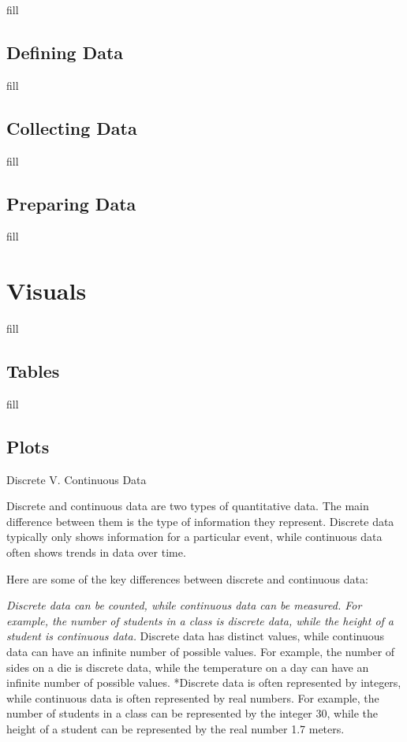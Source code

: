 \documentclass[
  b5paper]{book}
\begin{document}
fill

\hypertarget{defining-data}{%
\section{Defining Data}\label{defining-data}}

fill

\hypertarget{collecting-data}{%
\section{Collecting Data}\label{collecting-data}}

fill

\hypertarget{preparing-data}{%
\section{Preparing Data}\label{preparing-data}}

fill

\hypertarget{visuals-1}{%
\chapter{Visuals}\label{visuals-1}}

fill

\hypertarget{tables}{%
\section{Tables}\label{tables}}

fill

\hypertarget{plots}{%
\section{Plots}\label{plots}}

Discrete V. Continuous Data

Discrete and continuous data are two types of quantitative data. The main difference between them is the type of information they represent. Discrete data typically only shows information for a particular event, while continuous data often shows trends in data over time.

Here are some of the key differences between discrete and continuous data:

\emph{Discrete data can be counted, while continuous data can be measured. For example, the number of students in a class is discrete data, while the height of a student is continuous data.} Discrete data has distinct values, while continuous data can have an infinite number of possible values. For example, the number of sides on a die is discrete data, while the temperature on a day can have an infinite number of possible values. *Discrete data is often represented by integers, while continuous data is often represented by real numbers. For example, the number of students in a class can be represented by the integer 30, while the height of a student can be represented by the real number 1.7 meters.
\end{document}
